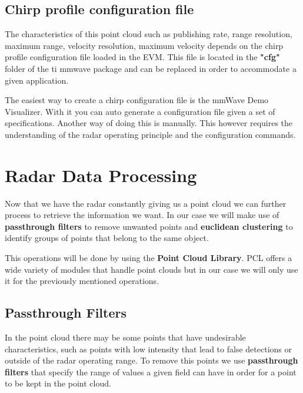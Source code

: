 \documentclass[12pt]{article}
\begin{document}
\subsection{Chirp profile configuration file}
The characteristics of this point cloud such as publishing rate, range resolution, maximum range, velocity resolution, maximum velocity depends on the chirp profile configuration file loaded in the EVM. This file is located in the \textbf{"cfg"} folder of the ti mmwave package and can be replaced in order to accommodate a given application.

The easiest way to create a chirp configuration file is the mmWave Demo Visualizer. With it you can auto generate a configuration file given a set of specifications.
Another way of doing this is manually. This however requires the understanding of the radar operating principle and the configuration commands.

\section{Radar Data Processing}
Now that we have the radar constantly giving us a point cloud we can further process to retrieve the information we want. 
In our case we will make use of \textbf{passthrough filters} to remove unwanted points and \textbf{euclidean clustering} to identify groups of points that belong to the same object.

This operations will be done by using the \textbf{Point Cloud Library}. PCL offers a wide variety of modules that handle point clouds but in our case we will only use it for the previously mentioned operations.
\subsection{Passthrough Filters}
In the point cloud there may be some points that have undesirable characteristics, such as points with low intensity  that lead to false detections or outside of the radar operating range. To remove this points we use \textbf{passthrough filters} that specify the range of values a given field can have in order for a point to be kept in the point cloud. 
\end{document}
